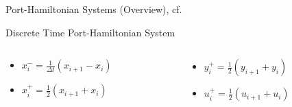 \begin{frame}{Port-Hamiltonian Systems (Overview), cf.~\cite{Morandin2022}}
    \begin{block}{Discrete Time Port-Hamiltonian System}
    \end{block}

    \begin{columns}
        \begin{column}{.27\textwidth}
            \begin{itemize}
                \item $x_i^- = \frac{1}{\Delta t} (x_{i + 1} - x_i)$
                \item $x_i^+ = \frac{1}{2} (x_{i + 1} + x_i)$
            \end{itemize}
        \end{column}
        \begin{column}{.27\textwidth}
            \begin{itemize}
                \item $y_i^+ = \frac{1}{2} (y_{i + 1} + y_i)$
                \item $u_i^+ = \frac{1}{2} (u_{i + 1} + u_i)$
            \end{itemize}
        \end{column}
    \end{columns}
\end{frame}

